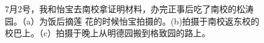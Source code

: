 \documentclass[cn,11pt,chinese]{elegantbook}
\begin{document}
\begin{figure}
    \caption{7月2号，我和怡宝去南校拿证明材料，办完正事后吃了南校的松涛园。（a）为饭后摘莲
    花的时候怡宝拍摄的。(b)拍摄于南校返东校的校巴上。（c）拍摄于晚上从明德园搬到格致园的路上。}
\end{figure}
\end{document}

